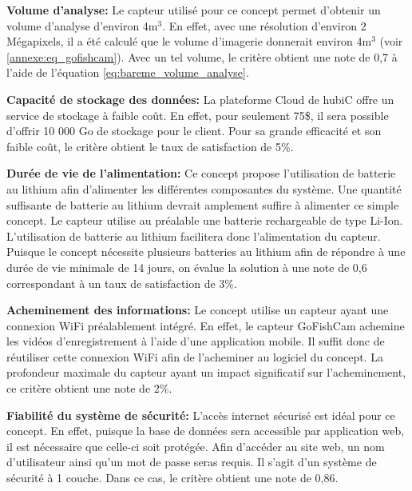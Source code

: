 \textbf{Volume d'analyse:} Le capteur utilisé pour ce concept permet d'obtenir un volume d'analyse d'environ 4m$^3$. En effet, avec une résolution d'environ 2 Mégapixels, il a été calculé que le volume d'imagerie donnerait environ 4m$^3$ (voir \ref{annexe:eq_gofishcam}). Avec un tel volume, le critère obtient une note de 0,7 à l'aide de l'équation \ref{eq:bareme_volume_analyse}.
\vspace{5mm}

\textbf{Capacité de stockage des données:} La plateforme Cloud de hubiC offre un service de stockage à faible coût. En effet, pour seulement 75\$, il sera possible d'offrir 10 000 Go de stockage pour le client. Pour sa grande efficacité et son faible coût, le critère obtient le taux de satisfaction de 5\%. \vspace{5mm}

\textbf{Durée de vie de l'alimentation:} Ce concept propose l'utilisation de batterie au lithium afin d'alimenter les différentes composantes du système. Une quantité suffisante de batterie au lithium devrait amplement suffire à alimenter ce simple concept. Le capteur utilise au préalable une batterie rechargeable de type Li-Ion. L'utilisation de batterie au lithium facilitera donc l'alimentation du capteur. Puisque le concept nécessite plusieurs batteries au lithium afin de répondre à une durée de vie minimale de 14 jours, on évalue la solution à une note de 0,6 correspondant à un taux de satisfaction de 3\%. \vspace{5mm}

\textbf{Acheminement des informations:} Le concept utilise un capteur ayant une connexion WiFi préalablement intégré. En effet, le capteur GoFishCam achemine les vidéos d'enregistrement à l'aide d'une application mobile. Il suffit donc de réutiliser cette connexion WiFi afin de l'acheminer au logiciel du concept. La profondeur maximale du capteur ayant un impact significatif sur l'acheminement, ce critère obtient une note de 2\%. \vspace{5mm}

\textbf{Fiabilité du système de sécurité:} L'accès internet sécurisé est idéal pour ce concept. En effet, puisque la base de données sera accessible par application web, il est nécessaire que celle-ci soit protégée. Afin d'accéder au site web, un nom d'utilisateur ainsi qu'un mot de passe seras requis. Il s'agit d'un système de sécurité à 1 couche. Dans ce cas, le critère obtient une note de 0,86.
\vspace{5mm}

